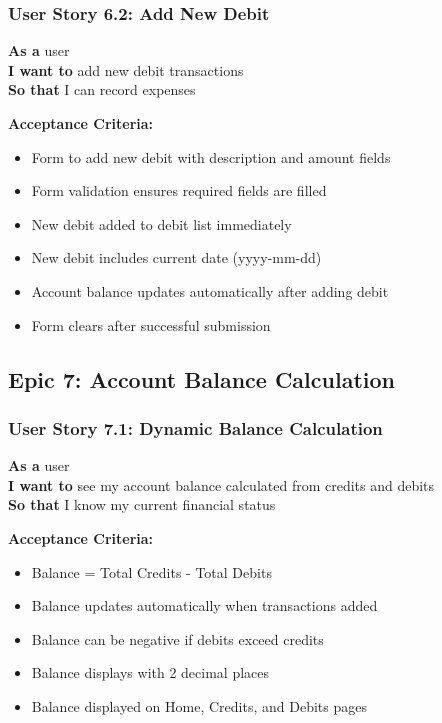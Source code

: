\documentclass[11pt,a4paper]{article}
\begin{document}
\subsubsection{User Story 6.2: Add New Debit}
\textbf{As a} user\\
\textbf{I want to} add new debit transactions\\
\textbf{So that} I can record expenses

\textbf{Acceptance Criteria:}
\begin{itemize}[leftmargin=*]
    \item Form to add new debit with description and amount fields
    \item Form validation ensures required fields are filled
    \item New debit added to debit list immediately
    \item New debit includes current date (yyyy-mm-dd)
    \item Account balance updates automatically after adding debit
    \item Form clears after successful submission
\end{itemize}

\subsection{Epic 7: Account Balance Calculation}

\subsubsection{User Story 7.1: Dynamic Balance Calculation}
\textbf{As a} user\\
\textbf{I want to} see my account balance calculated from credits and debits\\
\textbf{So that} I know my current financial status

\textbf{Acceptance Criteria:}
\begin{itemize}[leftmargin=*]
    \item Balance = Total Credits - Total Debits
    \item Balance updates automatically when transactions added
    \item Balance can be negative if debits exceed credits
    \item Balance displays with 2 decimal places
    \item Balance displayed on Home, Credits, and Debits pages
\end{itemize}
\end{document}
